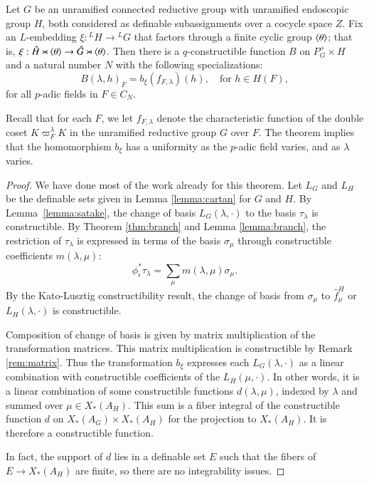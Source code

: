 \begin{theorem}\label{thm:B}
  Let $G$ be an unramified connected reductive group with unramified
  endoscopic group $H$, both considered as definable subassignments
  over a cocycle space $Z$.  Fix an $L$-embedding $\xi:{}^LH\to {}^LG$
  that factors through a finite cyclic group $\langle{\theta}\rangle$; that is,
  $\xi:\hat H\rtimes \langle{\theta}\rangle \to \hat G \rtimes \langle{\theta}\rangle$.
  Then there is a $q$-constructible function $B$ on $P^+_G\times H$
  and a natural number $N$ with the following specializations:
\[
B(\lambda,h)_F = b_\xi(f_{F,\lambda})(h),\quad \text{for } h\in H(F),
\]
for all $p$-adic fields in $F\in C_N$.  
\end{theorem}

Recall that for each $F$, we let $f_{F,\lambda}$ denote the
characteristic function of the double coset $K\varpi_F^\lambda K$ in
the unramified reductive group $G$ over $F$.  The theorem implies that
the homomorphism $b_\xi$ has a uniformity as the $p$-adic field
varies, and as $\lambda$ varies.

\begin{proof}
  We have done most of the work already for this theorem.  Let $L_G$
  and $L_H$ be the definable sets given in Lemma \ref{lemma:cartan}
  for $G$ and $H$.  By Lemma~\ref{lemma:satake}, the change of basis
  $L_G(\lambda,\cdot)$ to the basis $\tau_\lambda$ is constructible.
  By Theorem \ref{thm:branch} and Lemma \ref{lemma:branch}, the
  restriction of $\tau_\lambda$ is expressed in terms of the basis
  $\sigma_\mu$ through constructible coefficients $m(\lambda,\mu)$:
\[
\phi^*_\epsilon\tau_\lambda = \sum_{\mu} m(\lambda,\mu) \sigma_\mu.
\]
By the Kato-Lusztig constructibility result, the change of basis from
$\sigma_\mu$ to $\hat f^H_\mu$ or $L_H(\lambda,\cdot)$ is
constructible.
% 

Composition of change of basis is given
by matrix multiplication of the transformation matrices.  This matrix
multiplication is constructible by Remark \ref{rem:matrix}.  Thus the
transformation $b_\xi$ expresses each $L_G(\lambda,\cdot)$ as a linear
combination with constructible coefficients of the $L_H(\mu,\cdot)$.
In other words, it is a linear combination of some constructible
functions $d(\lambda,\mu)$, indexed by $\lambda$ and summed over
$\mu\in X_*(A_H)$.  This sum is a fiber integral of the constructible
function $d$ on $X_*(A_G)\times X_*(A_H)$ for the projection to
$X_*(A_H)$.  It is therefore a constructible function.

In fact, the support of $d$ lies in a definable set $E$ such that the
fibers of $E\to X_*(A_H)$ are finite, so there are no integrability
issues.
\end{proof}

